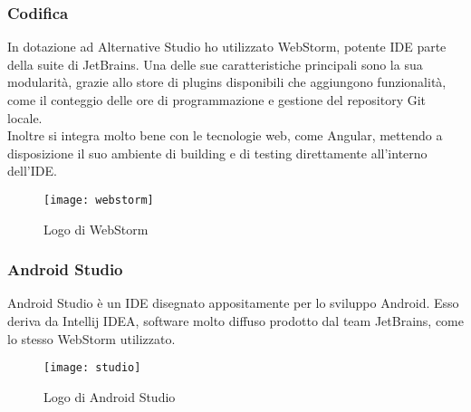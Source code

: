 \subsubsection{Codifica}
In dotazione ad Alternative Studio ho utilizzato WebStorm, potente IDE parte della suite di JetBrains. Una delle sue caratteristiche principali sono la sua modularità, grazie allo store di plugins disponibili che aggiungono funzionalità, come il conteggio delle ore di programmazione e gestione del repository \gls{Git} locale. \\
Inoltre si integra molto bene con le tecnologie web, come Angular, mettendo a disposizione il suo ambiente di building e di testing direttamente all'interno dell'IDE.
\begin{figure}[htbp]
	\begin{center}
		\texttt{[image: webstorm]}
		\caption{Logo di WebStorm}
	\end{center}
\end{figure}

\subsubsection{Android Studio}
Android Studio è un IDE disegnato appositamente per lo sviluppo Android. Esso deriva da Intellij IDEA, software molto diffuso prodotto dal team JetBrains, come lo stesso WebStorm utilizzato.

\begin{figure}[htbp]
	\begin{center}
		\texttt{[image: studio]}
		\caption{Logo di Android Studio}
	\end{center}
\end{figure}


